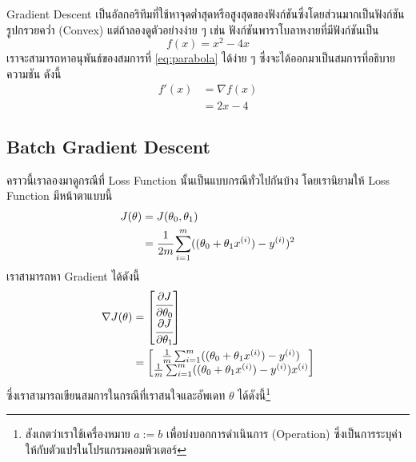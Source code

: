 Gradient Descent เป็นอัลกอริทึมที่ใช้หาจุดต่ำสุดหรือสูงสุดของฟังก์ชันซึ่งโดยส่วนมากเป็นฟังก์ชันรูปกรวยคว่ำ (Convex) แต่ถ้าลองดูตัวอย่างง่าย ๆ เช่น ฟังก์ชันพาราโบลาหงายที่มีฟังก์ชันเป็น
%
\begin{equation}\label{eq:parabola}
    f(x) = x^2 - 4x
\end{equation}
%
\noindent เราจะสามารถหาอนุพันธ์ของสมการที่ \eqref{eq:parabola} ได้ง่าย ๆ ซึ่งจะได้ออกมาเป็นสมการที่อธิบายความชัน ดังนี้
%
\begin{align}\label{eq:parabola_slope}
    f'(x) & = \nabla f(x) \nonumber \\
          & = 2x - 4
\end{align}

\subsection{Batch Gradient Descent}
\label{ssec:batch_grad}

คราวนี้เราลองมาดูกรณีที่ Loss Function นั้นเป็นแบบกรณีทั่วไปกันบ้าง โดยเรานิยามให้ Loss Function มีหน้าตาแบบนี้
%
\begin{align}\label{eq:batch_loss}
    J(\theta) & = J(\theta_0, \theta_1) \nonumber                                        \\
              & = \cfrac{1}{2m} \sum_{i=1}^m ((\theta_0 + \theta_1 x^{(i)}) - y^{(i)})^2
\end{align}
%
\noindent เราสามารถหา Gradient ได้ดังนี้
%
\begin{align}
    \nabla J (\theta) & = \begin{bmatrix} \cfrac{\partial J}{\partial \theta_0} \\ \cfrac{\partial J}{\partial
                                  \theta_1}\end{bmatrix}                 \\
                      & =  \begin{bmatrix} \frac{1}{m} \sum_{i=1}^{m} ((\theta_0 + \theta_1 x^{(i)}) - y^{(i)}) \\ \frac{1}{m}
                               \sum_{i=1}^{m} ((\theta_0 + \theta_1 x^{(i)}) - y^{(i)})x^{(i)}\end{bmatrix}
\end{align}
%
\noindent ซึ่งเราสามารถเขียนสมการในกรณีที่เราสนใจและอัพเดท $\theta$ ได้ดังนี้\footnote{สังเกตว่าเราใช้เครื่องหมาย $a := b$ เพื่อบ่งบอกการดำเนินการ (Operation) ซึ่งเป็นการระบุค่าให้กับตัวแปรในโปรแกรมคอมพิวเตอร์}

